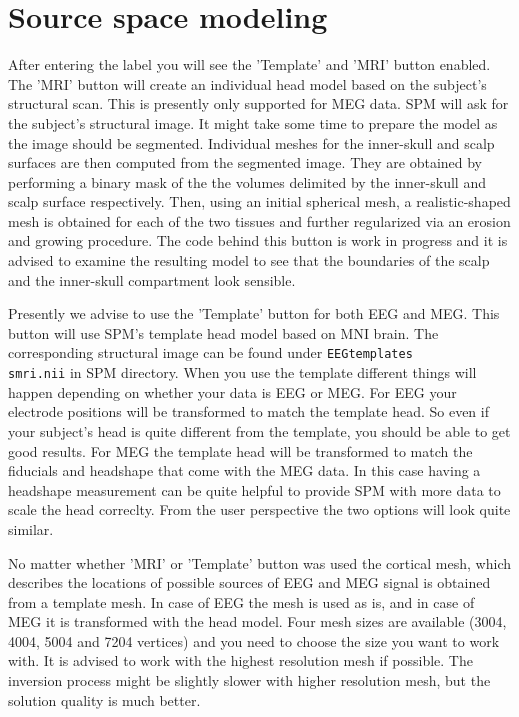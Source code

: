 \section{Source space modeling}

After entering the label you will see the 'Template' and 'MRI' button enabled. The 'MRI' button will 
create an individual head model based on the subject's structural scan. This is presently only supported for MEG
data. SPM will ask for the subject's structural image. It might take some time to prepare the model as the image
should be segmented. Individual meshes for the inner-skull and scalp surfaces are then computed from the
segmented image. They are obtained by performing a binary mask of the the volumes 
delimited by the inner-skull and scalp surface respectively. Then, using an initial 
spherical mesh, a realistic-shaped mesh is obtained for each of the two tissues 
and further regularized via an erosion and growing procedure. The code behind this button is work 
in progress and it is advised to examine the resulting
model to see that the boundaries of the scalp and the inner-skull compartment look sensible. 

Presently we advise to use the 'Template' button for both EEG and MEG. This button will use SPM's template head
model based on MNI brain. The corresponding structural image can be found under \texttt{EEGtemplates\\smri.nii} in SPM
directory. When you use the template different things will happen depending on whether your data is EEG or MEG.
For EEG your electrode positions will be transformed to match the template head. So even if your subject's head
is quite different from the template, you should be able to get good results. For MEG the template head will
be transformed to match the fiducials and headshape that come with the MEG data. In this case having a headshape
measurement can be quite helpful to provide SPM with more data to scale the head correclty. From the user
perspective the two options will look quite similar.

No matter whether 'MRI' or 'Template' button was used the cortical mesh, which describes the locations of
possible sources of EEG and MEG signal is obtained from a template mesh.
In case of EEG the mesh is used as is, and in case of MEG it is transformed with the head model. 
Four mesh sizes are available (3004, 4004, 5004 and 7204 vertices) and you need to choose the size
you want to work with. It is advised to work with the highest resolution mesh if possible. The inversion
process might be slightly slower with higher resolution mesh, but the solution quality is much better.

